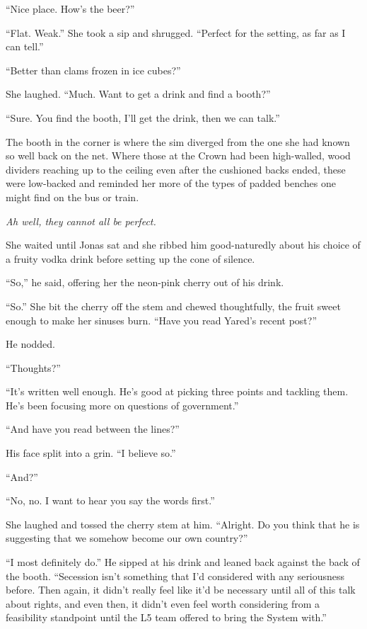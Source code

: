 ``Nice place. How's the beer?''

``Flat. Weak.'' She took a sip and shrugged. ``Perfect for the setting, as far as I can tell.''

``Better than clams frozen in ice cubes?''

She laughed. ``Much. Want to get a drink and find a booth?''

``Sure. You find the booth, I'll get the drink, then we can talk.''

The booth in the corner is where the sim diverged from the one she had known so well back on the net. Where those at the Crown had been high-walled, wood dividers reaching up to the ceiling even after the cushioned backs ended, these were low-backed and reminded her more of the types of padded benches one might find on the bus or train.

\emph{Ah well, they cannot all be perfect.}

She waited until Jonas sat and she ribbed him good-naturedly about his choice of a fruity vodka drink before setting up the cone of silence.

``So,'' he said, offering her the neon-pink cherry out of his drink.

``So.'' She bit the cherry off the stem and chewed thoughtfully, the fruit sweet enough to make her sinuses burn. ``Have you read Yared's recent post?''

He nodded.

``Thoughts?''

``It's written well enough. He's good at picking three points and tackling them. He's been focusing more on questions of government.''

``And have you read between the lines?''

His face split into a grin. ``I believe so.''

``And?''

``No, no. I want to hear you say the words first.''

She laughed and tossed the cherry stem at him. ``Alright. Do you think that he is suggesting that we somehow become our own country?''

``I most definitely do.'' He sipped at his drink and leaned back against the back of the booth. ``Secession isn't something that I'd considered with any seriousness before. Then again, it didn't really feel like it'd be necessary until all of this talk about rights, and even then, it didn't even feel worth considering from a feasibility standpoint until the L5 team offered to bring the System with.''

